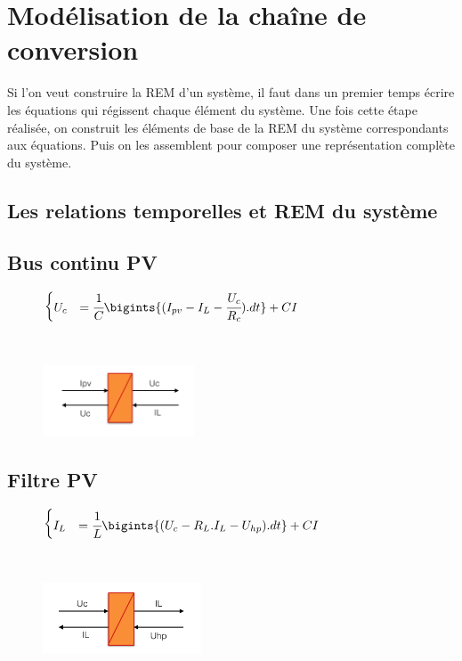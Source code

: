 \section{Modélisation de la chaîne de conversion}

Si l'on veut construire la REM d'un système, il faut dans un premier temps écrire les équations qui régissent chaque élément du système. Une fois cette étape réalisée, on construit les éléments de base de la REM du système correspondants aux équations. Puis on les assemblent pour composer une représentation complète du système.

\subsection{Les relations temporelles et REM du système}

\subsection{Bus continu PV}
\vspace{-10px}
\begin{figure}[ht]
\centering
\begin{minipage}{.5\textwidth}  
\centering
$\begin{cases}
	 U_{c} &= \cfrac{1}{C}\bigints{(I_{pv}-I_L-\cfrac{U_c}{R_c}).dt}+CI
\end{cases}$
\end{minipage}~
\begin{minipage}{.5\textwidth}
  \centering
\includegraphics[height=80px]{images/Bus.png}
\end{minipage}
\end{figure}
\FloatBarrier
\vspace{-20px}

\subsection{Filtre PV}
\vspace{-10px}
\begin{figure}[ht]
\centering
\begin{minipage}{.5\textwidth}  
\centering
$\begin{cases}
	 I_{L} &= \cfrac{1}{L}\bigints{(U_{c}-R_L.I_{L}-U_{hp}).dt}+CI
\end{cases}$
\end{minipage}~
\begin{minipage}{.5\textwidth}
  \centering
\includegraphics[height=80px]{images/Filtre.png}
\end{minipage}
\end{figure}
\FloatBarrier
\vspace{-20px}

